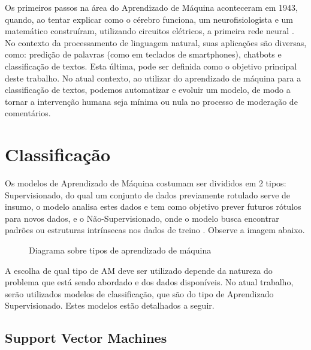 Os primeiros passos na área do Aprendizado de Máquina aconteceram em 1943, quando, ao tentar explicar como o cérebro funciona, um neurofisiologista e um matemático construíram, utilizando circuitos elétricos, a primeira rede neural \cite{nnhistory}. No contexto da processamento de linguagem natural, suas aplicações são diversas, como: predição de palavras (como em teclados de smartphones), chatbots e classificação de textos. Esta última, pode ser definida como o objetivo principal deste trabalho.
No atual contexto, ao utilizar do aprendizado de máquina para a classificação de textos, podemos automatizar e evoluir um modelo, de modo a tornar a intervenção humana seja mínima ou nula no processo de moderação de comentários.

\section{Classificação}

Os modelos de Aprendizado de Máquina costumam ser divididos em 2 tipos: Supervisionado, do qual um conjunto de dados previamente rotulado serve de insumo, o modelo analisa estes dados e tem como objetivo prever futuros rótulos para novos dados, e o Não-Supervisionado, onde o modelo busca encontrar padrões ou estruturas intrínsecas nos dados de treino \cite{mwmachinelearning}. Observe a imagem abaixo.

\begin{figure}[!htb]
    \caption{\label{fig:my-label} Diagrama sobre tipos de aprendizado de máquina}
\end{figure}

A escolha de qual tipo de AM deve ser utilizado depende da natureza do problema que está sendo abordado e dos dados disponíveis. No atual trabalho, serão utilizados modelos de classificação, que são do tipo de Aprendizado Supervisionado. Estes modelos estão detalhados a seguir.

\subsection{Support Vector Machines}

